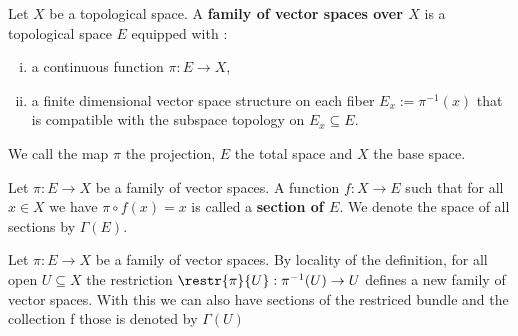 \begin{definition} \label{def:vb-familiyOfVectorSpaces}
	Let $X$ be a topological space. A \textbf{family of vector spaces over $X$} is a topological space $E$ equipped with :
	\begin{enumerate}[(i)]
		\item a continuous function $\pi: E \to X$,
		\item a finite dimensional vector space structure on each fiber $E_x:=\pi^{-1}(x)$ that is compatible with the subspace topology on $E_x\subseteq E$.
	\end{enumerate}
	We call the map $\pi$ the projection, $E$ the total space and $X$ the base space. 
\end{definition}
\begin{definition}[Sections]
	Let $\pi: E\to X$ be a family of vector spaces. A function $f:X\to E$ such that for all $x\in X$ we have $\pi\circ f (x)=x$ is called a \textbf{section of $E$}. We denote the space of all sections by $\Gamma(E)$. 
\end{definition}
\begin{remark} Let $\pi: E\to X$ be a family of vector spaces.
By locality of the definition, for all open $U\subseteq X$ the restriction $\restr{\pi}{U}:\pi^{-1}(U)\to U$ defines a new family of vector spaces. With this we can also have sections of the restriced bundle and the collection f those is denoted by $\Gamma(U)$
\end{remark}



